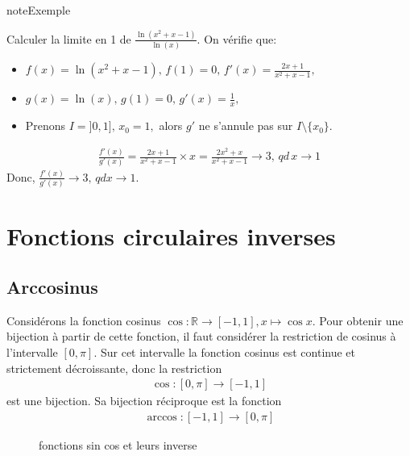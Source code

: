 \documentclass[letterpaper,10pt,french]{jupyterBook}
\let\sphinxpxdimen\pdfpxdimen\else\newdimen\sphinxpxdimen
\begin{document}
\begin{sphinxadmonition}{note}{Exemple}

\sphinxAtStartPar
Calculer la limite en 1 de \(\frac{\ln(x^2+x-1)}{\ln(x)}.\) On vérifie que:
\begin{itemize}
\item {} 
\sphinxAtStartPar
\(f(x)=\ln(x^2+x-1),\, f(1)=0,\,f'(x)=\frac{2x+1}{x^2+x-1},\)

\item {} 
\sphinxAtStartPar
\(g(x)=\ln(x),\,g(1)=0,\,g'(x)=\frac{1}{x},\)

\item {} 
\sphinxAtStartPar
Prenons \(I=]0,1],\,x_0=1,\) alors \(g'\) ne s’annule pas sur \(I\setminus\{x_0\}.\)

\end{itemize}
\begin{equation*}
\begin{split}
\frac{f'(x)}{g'(x)}=\frac{2x+1}{x^2+x-1}\times x=\frac{2x^2+x}{x^2+x-1}\rightarrow 3,\,qd \,x\rightarrow 1
\end{split}
\end{equation*}
\sphinxAtStartPar
Donc, \(\frac{f'(x)}{g'(x)}\rightarrow 3,\,qd x\rightarrow 1.\)
\end{sphinxadmonition}


\section{Fonctions circulaires inverses}
\label{\detokenize{fcthycerinvs:fonctions-circulaires-inverses}}\label{\detokenize{fcthycerinvs::doc}}

\subsection{Arccosinus}
\label{\detokenize{fcthycerinvs:arccosinus}}
\sphinxAtStartPar
Considérons la fonction cosinus \(\cos : \mathbb{R}\rightarrow[−1,1], x \mapsto\cos x.\) Pour obtenir une bijection à partir de
cette fonction, il faut considérer la restriction de cosinus à l’intervalle \([0,\pi].\) Sur cet intervalle la
fonction cosinus est continue et strictement décroissante, donc la restriction
\begin{equation*}
\begin{split}
\cos:[0,\pi]\rightarrow[-1,1]
\end{split}
\end{equation*}
\sphinxAtStartPar
est une bijection. Sa bijection réciproque est la fonction 
\begin{equation*}
\begin{split}
\arccos :[-1,1]\rightarrow[0,\pi]
\end{split}
\end{equation*}
\begin{figure}[htbp]
\centering
\capstart

\noindent\sphinxincludegraphics[height=150\sphinxpxdimen]{{sinconsinv}.png}
\caption{fonctions sin cos et leurs inverse}\label{\detokenize{fcthycerinvs:directive-fig}}\end{figure}
\end{document}
